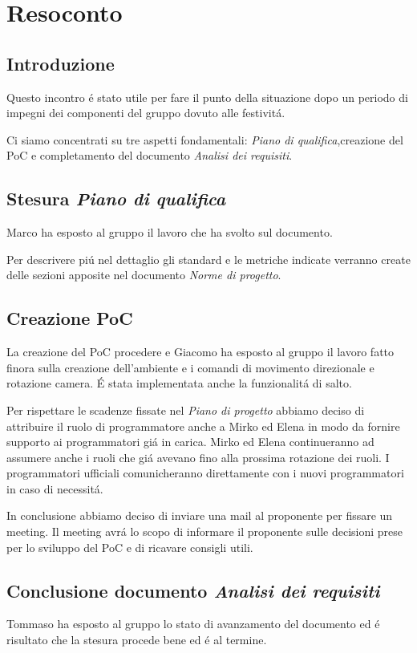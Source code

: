 \section{Resoconto}
\subsection{Introduzione}
Questo incontro é stato utile per fare il punto della situazione dopo un periodo di impegni
dei componenti del gruppo dovuto alle festivitá.

Ci siamo concentrati su tre aspetti fondamentali: \textit{Piano di qualifica},creazione del PoC e completamento 
del documento \textit{Analisi dei requisiti}.
\subsection{Stesura \textit{Piano di qualifica}}
Marco ha esposto al gruppo il lavoro che ha svolto sul documento.

Per descrivere piú nel dettaglio gli standard e le metriche indicate verranno create
delle sezioni apposite nel documento \textit{Norme di progetto}.
\subsection{Creazione PoC}
La creazione del PoC procedere e Giacomo ha esposto al gruppo il lavoro
fatto finora sulla creazione dell'ambiente e i comandi di movimento direzionale e rotazione camera.
É stata implementata anche la funzionalitá di salto.

Per rispettare le scadenze fissate nel \textit{Piano di progetto} abbiamo deciso di attribuire il ruolo di programmatore anche a Mirko ed Elena 
in modo da fornire supporto ai programmatori giá in carica.
Mirko ed Elena continueranno ad assumere anche i ruoli che giá avevano fino alla prossima rotazione dei ruoli.
I programmatori ufficiali comunicheranno direttamente con i nuovi programmatori in caso di necessitá.

In conclusione abbiamo deciso di inviare una mail al proponente per fissare un meeting.
Il meeting avrá lo scopo di informare il proponente sulle decisioni prese per lo sviluppo del PoC e 
di ricavare consigli utili. 
\subsection{Conclusione documento \textit{Analisi dei requisiti}}
Tommaso ha esposto al gruppo lo stato di avanzamento del documento ed é risultato che la stesura procede bene ed
é al termine.
